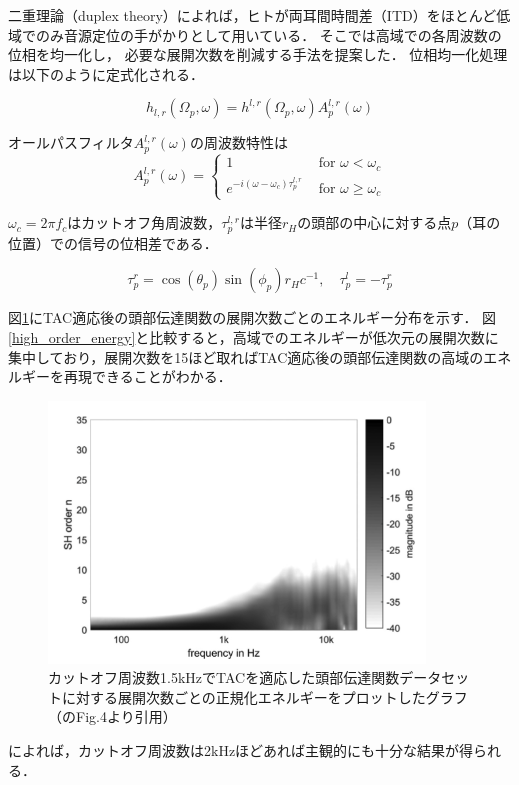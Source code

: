 \documentclass[a4paper]{jsarticle}
\begin{document}
二重理論（duplex theory）によれば，ヒトが両耳間時間差（ITD）をほとんど低域でのみ音源定位の手がかりとして用いている\cite{roginska2017immersive}．
そこで\citeauthor{Zaunschirm2018-mn}\cite{Zaunschirm2018-mn}は高域での各周波数の位相を均一化し，
必要な展開次数を削減する手法を提案した．
位相均一化処理は以下のように定式化される．

$$
    h_{l, r}\left(\Omega_{p}, \omega\right)=h^{l, r}\left(\Omega_{p}, \omega\right) A_{p}^{l, r}(\omega)
$$

オールパスフィルタ$A_{p}^{l, r}(\omega)$の周波数特性は
$$
    A_{p}^{l, r}(\omega)=\left\{\begin{array}{ll}
        1                                                    & \text { for } \omega<\omega_{c}      \\
        e^{-i\left(\omega-\omega_{c}\right) \tau_{p}^{l, r}} & \text { for } \omega \geq \omega_{c}
    \end{array}\right.
$$

$\omega_c=2\pi f_c$はカットオフ角周波数，$\tau_{p}^{l, r}$は半径$r_H$の頭部の中心に対する点$p$（耳の位置）での信号の位相差である．

$$
    \tau_{p}^{r}=\cos \left(\theta_{p}\right) \sin \left(\phi_{p}\right) r_{H} c^{-1}, \quad \tau_{p}^{l}=-\tau_{p}^{r}
$$

図\ref{high_order_energy_improved}にTAC適応後の頭部伝達関数の展開次数ごとのエネルギー分布を示す．
図\ref{high_order_energy}と比較すると，高域でのエネルギーが低次元の展開次数に集中しており，展開次数を15ほど取ればTAC適応後の頭部伝達関数の高域のエネルギーを再現できることがわかる．
\begin{figure}[H]
    \centering
    \includegraphics[clip,width=10cm]{./high_order_energy_improved.png}
    \caption{カットオフ周波数1.5kHzでTACを適応した頭部伝達関数データセットに対する展開次数ごとの正規化エネルギーをプロットしたグラフ（\cite{Zaunschirm2018-mn}のFig.4より引用）}
    \label{high_order_energy_improved}
\end{figure}
\cite{Schorkhuber2018-ql}によれば，カットオフ周波数は2kHzほどあれば主観的にも十分な結果が得られる．








\end{document}
